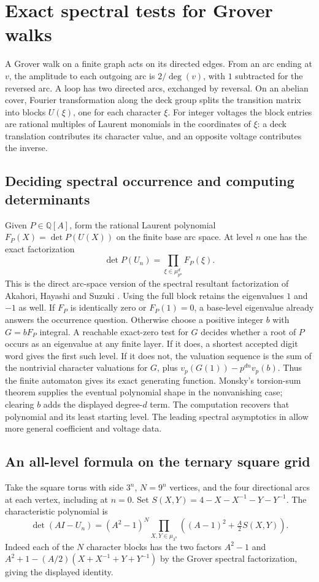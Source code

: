 \section{Exact spectral tests for Grover walks}
A Grover walk on a finite graph acts on its directed edges. From an arc ending
at $v$, the amplitude to each outgoing arc is $2/\deg(v)$, with $1$
subtracted for the reversed arc. A loop has two directed arcs, exchanged by
reversal. On an abelian cover, Fourier transformation along the deck group
splits the transition matrix into blocks $U(\xi)$, one for each character
$\xi$. For integer voltages the block entries are rational multiples of
Laurent monomials in the coordinates of $\xi$: a deck translation contributes
its character value, and an opposite voltage contributes the inverse.

\subsection*{Deciding spectral occurrence and computing determinants}
Given $P\in\mathbb Q[A]$, form the rational Laurent polynomial
$F_P(X)=\det P(U(X))$ on the finite base arc space.
At level $n$ one has the exact factorization
\[
                \det P(U_n)=\prod_{\xi\in\mu_{p^n}^d}F_P(\xi).
\]
This is the direct arc-space version of the spectral resultant factorization
of Akahori, Hayashi and Suzuki \cite[Theorems 3.3 and 4.3]{AHS}.
Using the full block retains the eigenvalues $1$ and $-1$ as well.
If $F_P$ is identically zero or $F_P(1)=0$, a base-level eigenvalue
already answers the occurrence question. Otherwise choose a positive
integer $b$ with $G=bF_P$ integral. A reachable exact-zero test for $G$
decides whether a root of $P$ occurs as an eigenvalue at any finite layer.
If it does, a shortest accepted digit word gives the first such level.
If it does not, the valuation sequence is the sum of the nontrivial
character valuations for $G$, plus $v_p(G(1))-p^{dn}v_p(b)$.
Thus the finite automaton gives its exact generating function. Monsky's
torsion-sum theorem \cite{monsky} supplies the eventual polynomial shape
in the nonvanishing case; clearing $b$ adds the displayed degree-$d$
term. The computation recovers that polynomial and its least starting
level. The leading spectral asymptotics in \cite[Theorem 4.3]{AHS}
allow more general coefficient and voltage data.

\subsection*{An all-level formula on the ternary square grid}
Take the square torus with side $3^n$, $N=9^n$ vertices, and the four
directional arcs at each vertex, including at $n=0$. Set
$S(X,Y)=4-X-X^{-1}-Y-Y^{-1}$. The characteristic polynomial is
\[
 \det(AI-U_n)=(A^2-1)^N
  \prod_{X,Y\in\mu_{3^n}}\left((A-1)^2+\tfrac A2 S(X,Y)\right).
\]
Indeed each of the $N$ character blocks has the two factors $A^2-1$ and
$A^2+1-(A/2)(X+X^{-1}+Y+Y^{-1})$ by the Grover spectral
factorization, giving the displayed identity.

